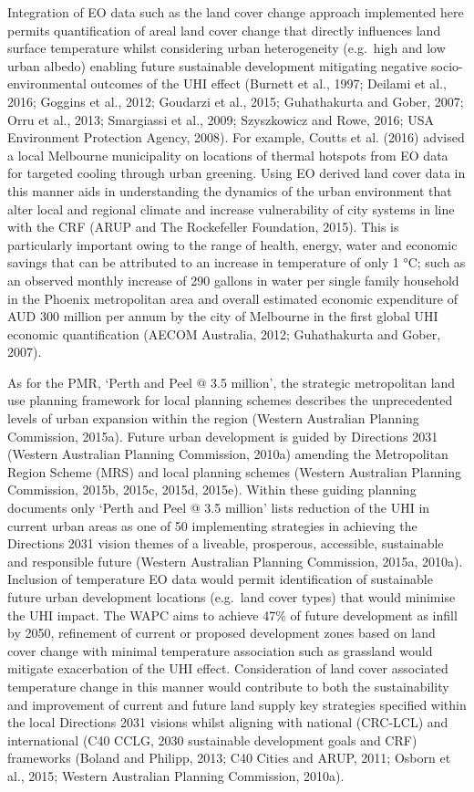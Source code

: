 \documentclass[]{book}
\begin{document}
Integration of EO data such as the land cover change approach
implemented here permits quantification of areal land cover change that
directly influences land surface temperature whilst considering urban
heterogeneity (e.g.~high and low urban albedo) enabling future
sustainable development mitigating negative socio-environmental outcomes
of the UHI effect (Burnett et al., 1997; Deilami et al., 2016; Goggins
et al., 2012; Goudarzi et al., 2015; Guhathakurta and Gober, 2007; Orru
et al., 2013; Smargiassi et al., 2009; Szyszkowicz and Rowe, 2016; USA
Environment Protection Agency, 2008). For example, Coutts et al. (2016)
advised a local Melbourne municipality on locations of thermal hotspots
from EO data for targeted cooling through urban greening. Using EO
derived land cover data in this manner aids in understanding the
dynamics of the urban environment that alter local and regional climate
and increase vulnerability of city systems in line with the CRF (ARUP
and The Rockefeller Foundation, 2015). This is particularly important
owing to the range of health, energy, water and economic savings that
can be attributed to an increase in temperature of only 1 °C; such as an
observed monthly increase of 290 gallons in water per single family
household in the Phoenix metropolitan area and overall estimated
economic expenditure of AUD 300 million per annum by the city of
Melbourne in the first global UHI economic quantification (AECOM
Australia, 2012; Guhathakurta and Gober, 2007).

As for the PMR, `Perth and Peel @ 3.5 million', the strategic
metropolitan land use planning framework for local planning schemes
describes the unprecedented levels of urban expansion within the region
(Western Australian Planning Commission, 2015a). Future urban
development is guided by Directions 2031 (Western Australian Planning
Commission, 2010a) amending the Metropolitan Region Scheme (MRS) and
local planning schemes (Western Australian Planning Commission, 2015b,
2015c, 2015d, 2015e). Within these guiding planning documents only
`Perth and Peel @ 3.5 million' lists reduction of the UHI in current
urban areas as one of 50 implementing strategies in achieving the
Directions 2031 vision themes of a liveable, prosperous, accessible,
sustainable and responsible future (Western Australian Planning
Commission, 2015a, 2010a). Inclusion of temperature EO data would permit
identification of sustainable future urban development locations
(e.g.~land cover types) that would minimise the UHI impact. The WAPC
aims to achieve 47\% of future development as infill by 2050, refinement
of current or proposed development zones based on land cover change with
minimal temperature association such as grassland would mitigate
exacerbation of the UHI effect. Consideration of land cover associated
temperature change in this manner would contribute to both the
sustainability and improvement of current and future land supply key
strategies specified within the local Directions 2031 visions whilst
aligning with national (CRC-LCL) and international (C40 CCLG, 2030
sustainable development goals and CRF) frameworks (Boland and Philipp,
2013; C40 Cities and ARUP, 2011; Osborn et al., 2015; Western Australian
Planning Commission, 2010a).
\end{document}
